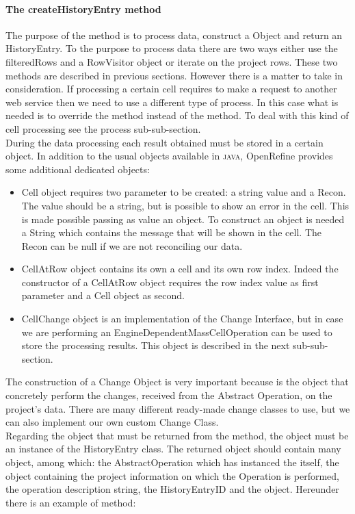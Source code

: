 \paragraph{The createHistoryEntry method} The purpose of the  method is to process data, construct a  Object and return an HistoryEntry. To the purpose to process data there are two ways either use the filteredRows and a RowVisitor object or iterate on the project rows. These two methods are described in previous sections. However there is a matter to take in consideration. If processing a certain cell requires to make a request to another web service then we need to use a different type of process. In this case what is needed is to override the  method instead of the  method. To deal with this kind of cell processing see the process sub-sub-section. \\
During the data processing each result obtained must be stored in a certain object. In addition to the usual objects available in \textsc{java}, OpenRefine provides some additional dedicated objects:
\begin{itemize}
	\item Cell object requires two parameter to be created: a string value and a Recon. The value should be a string, but is possible to show an error in the cell. This is made possible passing as value an  object. To construct an  object is needed a String which contains the message that will be shown in the cell. The Recon can be null if we are not reconciling our data.
	\item CellAtRow object contains its own a cell and its own row index. Indeed the constructor of a CellAtRow object requires the row index value as first parameter and a Cell object as second.
	\item CellChange object is an implementation of the Change Interface, but in case we are performing an EngineDependentMassCellOperation can be used to store the processing results. This object is described in the next sub-sub-section.
\end{itemize}
The construction of a Change Object is very important because is the object that concretely perform the changes, received from the Abstract Operation, on the project's data. There are many different ready-made change classes to use, but we can also implement our own custom Change Class.\\ 
Regarding the object that must be returned from the  method, the object must be an instance of the HistoryEntry class. The returned  object should contain many object, among which: the AbstractOperation which has instanced the  itself, the  object containing the project information on which the Operation is performed, the operation description string, the HistoryEntryID and the  object. Hereunder there is an example of  method:
